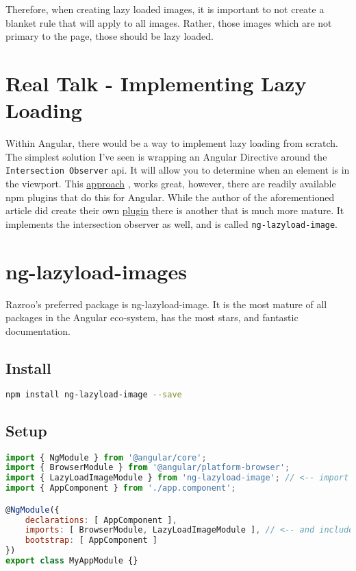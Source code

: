Therefore, when creating lazy loaded images, it is important to not create a 
blanket rule that will apply to all images. Rather, those images which are not 
primary to the page, those should be lazy loaded. 

\section{ Real Talk - Implementing Lazy Loading }
Within Angular, there would be a way to implement lazy loading from scratch. 
The simplest solution I've seen is wrapping an Angular Directive around the 
\lstinline{Intersection Observer} api. It will allow you to determine when 
an element is in the viewport. 
This \href{https://blog.angularindepth.com/a-modern-solution-to-lazy-loading-using-intersection-observer-9280c149bbc}{approach}
, works great, however, there are readily available npm plugins that do this for Angular. 
While the author of the aforementioned article did create their own \href{https://github.com/TradeMe/ng-defer-load}{plugin}
there is another that is much more mature. It implements the intersection 
observer as well, and is called \lstinline{ng-lazyload-image}.

\section{ng-lazyload-images}
Razroo's preferred package is ng-lazyload-image. It is the most mature of 
all packages in the Angular eco-system, has the most stars, and fantastic 
documentation. 

\subsection{Install}
\begin{lstlisting}[language=bash]
npm install ng-lazyload-image --save
\end{lstlisting}

\subsection{Setup}
\begin{lstlisting}[language=javascript]
import { NgModule } from '@angular/core';
import { BrowserModule } from '@angular/platform-browser';
import { LazyLoadImageModule } from 'ng-lazyload-image'; // <-- import it
import { AppComponent } from './app.component';

@NgModule({
    declarations: [ AppComponent ],
    imports: [ BrowserModule, LazyLoadImageModule ], // <-- and include it
    bootstrap: [ AppComponent ]
})
export class MyAppModule {}
\end{lstlisting}

